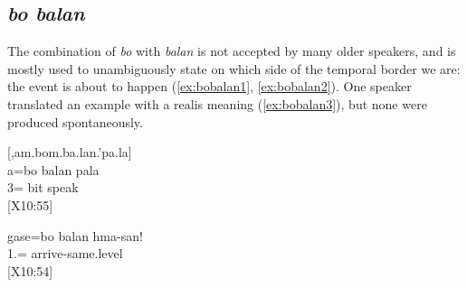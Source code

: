 \subsection{\textit{bo balan} }
\label{ssec:bo balan}
The combination of \textit{bo} with \textit{balan} is not accepted by many older speakers, and is mostly used to unambiguously state on which side of the temporal border we are: the event is about to happen (\ref{ex:bobalan1}, \ref{ex:bobalan2}). One speaker translated an example with a realis meaning (\ref{ex:bobalan3}), but none were produced spontaneously.




	\ea\label{ex:bobalan1}
	[,am.bom.ba.lan.'pa.la]\\
	\gll a=bo balan pala\\
	 3= bit speak\\
	\glt {} {[X10:55]}
	\z
	
	\ea\label{ex:bobalan2}
	\gll gase=bo balan hma-san!\\
	 1.=  arrive-same.level\\
	\glt {} {[X10:54]}
	\z
	
